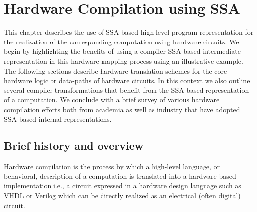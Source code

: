 \chapter{Hardware Compilation using SSA}
\label{chapter:hardware_compilation}

This chapter describes the use of SSA-based high-level program representation for the realization of the corresponding computation using hardware circuits. 
  We begin by highlighting the benefits of using a compiler SSA-based intermediate representation in this hardware mapping process using an illustrative example. 
  The following sections describe hardware translation schemes for the core hardware logic or data-paths of hardware circuits. 
  In this context we also outline several compiler transformations that benefit from the SSA-based representation of a computation. 
  We conclude with a brief survey of various hardware compilation efforts both from academia as well as industry that have adopted SSA-based internal representations.


\renewcommand{\comment}[1]{}

\section{Brief history and overview}

Hardware compilation is the process by which a high-level language, or behavioral, description of a computation is translated into a hardware-based implementation i.e., a circuit expressed in a hardware design language such as VHDL or Verilog which can be directly realized as an electrical (often digital) circuit. 

